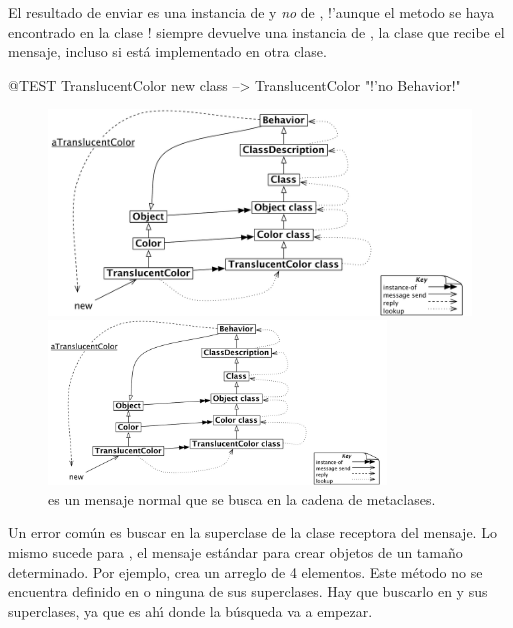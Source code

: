 \documentclass[a4paper,10pt,twoside]{book}
\begin{document}
El resultado de enviar  es una instancia de  y \emph{no} de , !'aunque el metodo se haya encontrado en la clase !  siempre devuelve una instancia de \self, la clase que recibe el mensaje, incluso si est\'a implementado en otra clase.

\begin{code}{@TEST}
TranslucentColor new class --> TranslucentColor    "!'no Behavior!"
\end{code}

\begin{center}
\begin{figure}
\ifluluelse
	{\centerline{\includegraphics[width=\textwidth]{TranslucentSendingNew}}}
	{\centerline{\includegraphics[width=0.8\textwidth]{TranslucentSendingNew}}}
\caption{ es un mensaje normal que se busca en la cadena de metaclases.}
\end{figure}
\end{center}

Un error com\'un es buscar  en la superclase de la clase receptora del mensaje. Lo mismo sucede para , el mensaje est\'andar para crear objetos de un tama\~no determinado. Por ejemplo,  crea un arreglo de 4 elementos. Este m\'etodo no se encuentra definido en  o ninguna de sus superclases. Hay que buscarlo en  y sus superclases, ya que es ah\'{\i} donde la b\'usqueda va a empezar.
\end{document}
